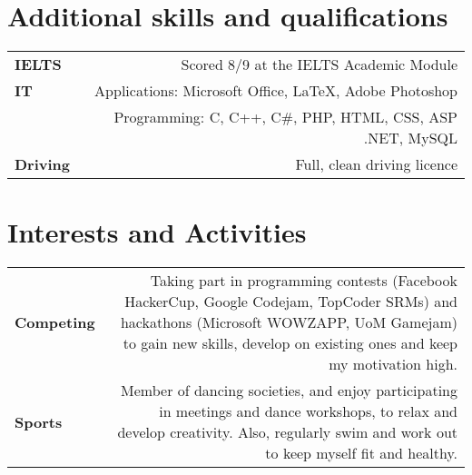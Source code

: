 \documentclass[11pt,a4paper]{article}
\begin{document}
\section*{Additional skills and qualifications\vspace{-2ex}}
\begin{tabular}{LR}
\bf IELTS&Scored 8/9 at the IELTS Academic Module\vspace{5pt}\\
\bf IT&Applications: Microsoft Office, \LaTeX, Adobe Photoshop\\
&Programming: C, C++, C\#, PHP, HTML, CSS, ASP .NET, MySQL\vspace{5pt}\\
\bf Driving&Full, clean driving licence\\
\end{tabular}

\section*{Interests and Activities\vspace{-2ex}}
\begin{tabular}{LR}
\bf Competing&Taking part in programming contests (Facebook HackerCup, Google Codejam, TopCoder SRMs) and hackathons (Microsoft WOWZAPP, UoM Gamejam)
 to gain new skills, develop on existing ones and keep my motivation high.\\
\bf Sports&Member of dancing societies, and enjoy participating in meetings and dance workshops, to relax and develop creativity. Also, regularly swim and work out to keep myself fit and healthy.\\
\end{tabular}
\thispagestyle{empty}
\end{document}
